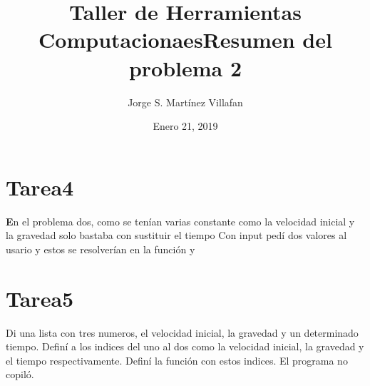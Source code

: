 \documentclass[letterpaper, 12pt, oneside]{article}%
\title{\Huge Taller de Herramientas Computacionaes}
\author{Jorge S. Martínez Villafan}
\date{Enero 21, 2019}
\begin{document}
\maketitle
\newpage
\title{Resumen del problema 2}
\section{Tarea4}
\textbf En el problema dos, como se tenían varias constante como la velocidad inicial y la gravedad solo bastaba con sustituir el tiempo Con input pedí dos valores al usario y estos se resolverían en la función y 

\section{Tarea5}
Di una lista con tres numeros, el velocidad inicial, la gravedad y un determinado tiempo. Definí a los indices del uno al dos como la velocidad inicial, la gravedad y el tiempo respectivamente. Definí la función con estos indices. El programa no copiló.
\end{document}
